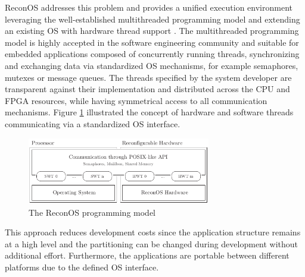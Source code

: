 ReconOS addresses this problem and provides a unified execution environment
leveraging the well-established multithreaded programming model and extending
an existing \ac{OS} with hardware thread support \citep{AHK14}. The
multithreaded programming model is highly accepted in the software engineering
community and suitable for embedded applications \citep{ANA04} composed of
concurrently running threads, synchronizing and exchanging data via
standardized \ac{OS} mechanisms, for example semaphores, mutexes or message
queues. The threads specified by the system developer are transparent against
their implementation and distributed across the \ac{CPU} and \ac{FPGA}
resources, while having symmetrical access to all communication mechanisms.
Figure
\ref{fig:reconos_model} illustrated the concept of hardware and software
threads communicating via a standardized \ac{OS} interface.
\begin{figure}[tb]
	\centering
	\includegraphics[width=8cm]{../figures/reconos_model}
	\caption{The ReconOS programming model}
	\label{fig:reconos_model}
\end{figure}
This approach reduces development costs since the application structure
remains at a high level and the partitioning can be changed during development
without additional effort. Furthermore, the applications are portable between
different platforms due to the defined \ac{OS} interface.

